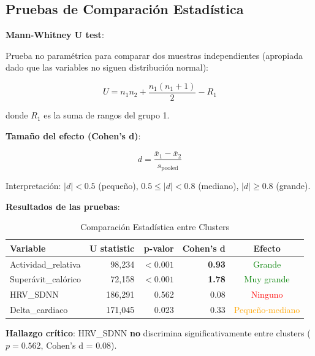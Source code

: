 \documentclass[12pt,letterpaper,twoside]{report}
\begin{document}
\subsection{Pruebas de Comparación Estadística}

\begin{estadisticobox}
\textbf{Mann-Whitney U test}:

Prueba no paramétrica para comparar dos muestras independientes (apropiada dado que las variables no siguen distribución normal):

\begin{equation}
U = n_1 n_2 + \frac{n_1(n_1+1)}{2} - R_1
\end{equation}

donde $R_1$ es la suma de rangos del grupo 1.

\textbf{Tamaño del efecto (Cohen's d)}:

\begin{equation}
d = \frac{\bar{x}_1 - \bar{x}_2}{s_{\text{pooled}}}
\end{equation}

Interpretación: $|d| < 0.5$ (pequeño), $0.5 \leq |d| < 0.8$ (mediano), $|d| \geq 0.8$ (grande).
\end{estadisticobox}

\begin{calculobox}
\textbf{Resultados de las pruebas}:

\begin{table}[H]
\centering
\caption{Comparación Estadística entre Clusters}
\label{tab:cluster_comparison}
\begin{tabular}{@{}lrrrc@{}}
\toprule
\textbf{Variable} & \textbf{U statistic} & \textbf{p-valor} & \textbf{Cohen's d} & \textbf{Efecto} \\
\midrule
Actividad\_relativa     & 98,234  & $< 0.001$ & \textbf{0.93} & \textcolor{green}{Grande} \\
Superávit\_calórico     & 72,158  & $< 0.001$ & \textbf{1.78} & \textcolor{green}{Muy grande} \\
HRV\_SDNN               & 186,291 & 0.562     & 0.08 & \textcolor{red}{Ninguno} \\
Delta\_cardiaco         & 171,045 & 0.023     & 0.33 & \textcolor{orange}{Pequeño-mediano} \\
\bottomrule
\end{tabular}
\end{table}

\textbf{Hallazgo crítico}: HRV\_SDNN \textbf{no} discrimina significativamente entre clusters ($p=0.562$, Cohen's d = 0.08).
\end{calculobox}
\end{document}
